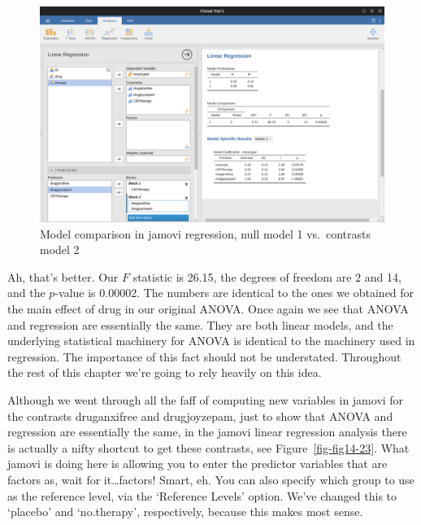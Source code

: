 \documentclass[
  a4paper,
]{book}
\begin{document}
\begin{figure}

\includegraphics[width=1\textwidth,height=\textheight]{images/fig14-22.png} \hfill{}

\caption{\label{fig-fig14-22}Model comparison in jamovi regression, null
model 1 vs.~contrasts model 2}

\end{figure}

Ah, that's better. Our \(F\) statistic is 26.15, the degrees of freedom
are 2 and 14, and the \(p\)-value is 0.00002. The numbers are identical
to the ones we obtained for the main effect of drug in our original
ANOVA. Once again we see that ANOVA and regression are essentially the
same. They are both linear models, and the underlying statistical
machinery for ANOVA is identical to the machinery used in regression.
The importance of this fact should not be understated. Throughout the
rest of this chapter we're going to rely heavily on this idea.

Although we went through all the faff of computing new variables in
jamovi for the contrasts druganxifree and drugjoyzepam, just to show
that ANOVA and regression are essentially the same, in the jamovi linear
regression analysis there is actually a nifty shortcut to get these
contrasts, see Figure~\ref{fig-fig14-23}. What jamovi is doing here is
allowing you to enter the predictor variables that are factors as, wait
for it\ldots factors! Smart, eh. You can also specify which group to use
as the reference level, via the `Reference Levels' option. We've changed
this to `placebo' and `no.therapy', respectively, because this makes
most sense.
\end{document}
